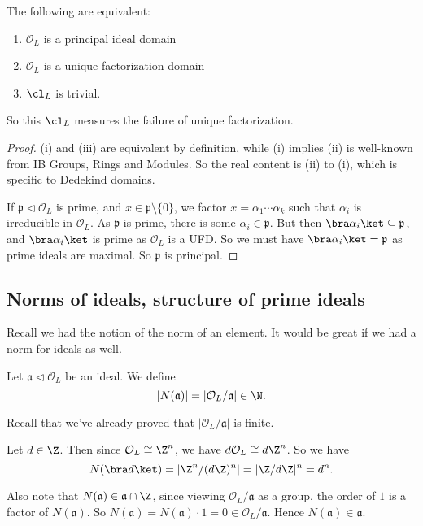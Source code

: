 \documentclass[a4paper]{article}
\begin{document}
\begin{thm}
  The following are equivalent:
  \begin{enumerate}
    \item $\mathcal{O}_L$ is a principal ideal domain
    \item $\mathcal{O}_L$ is a unique factorization domain
    \item $\cl_L$ is trivial.
  \end{enumerate}
\end{thm}
So this $\cl_L$ measures the failure of unique factorization.
\begin{proof}
  (i) and (iii) are equivalent by definition, while (i) implies (ii) is well-known from IB Groups, Rings and Modules. So the real content is (ii) to (i), which is specific to Dedekind domains.

  If $\mathfrak{p} \lhd \mathcal{O}_L$ is prime, and $x \in \mathfrak{p} \setminus \{0\}$, we factor $x = \alpha_1 \cdots \alpha_k$ such that $\alpha_i$ is irreducible in $\mathcal{O}_L$. As $\mathfrak{p}$ is prime, there is some $\alpha_i \in \mathfrak{p}$. But then $\bra \alpha_i\ket \subseteq \mathfrak{p}$, and $\bra \alpha_i\ket$ is prime as $\mathcal{O}_L$ is a UFD. So we must have $\bra \alpha_i\ket = \mathfrak{p}$ as prime ideals are maximal. So $\mathfrak{p}$ is principal.
\end{proof}

\subsection{Norms of ideals, structure of prime ideals}
Recall we had the notion of the norm of an element. It would be great if we had a norm for ideals as well.
\begin{defi}
  Let $\mathfrak{a} \lhd \mathcal{O}_L$ be an ideal. We define
  \[
    |N(\mathfrak{a})| = |\mathcal{O}_L/\mathfrak{a}| \in \N.
  \]
\end{defi}
Recall that we've already proved that $|\mathcal{O}_L/\mathfrak{a}|$ is finite.

\begin{eg}
  Let $d \in \Z$. Then since $\mathcal{O}_L \cong \Z^n$, we have $d \mathcal{O}_L \cong d \Z^n$. So we have
  \[
    N(\bra d\ket) = |\Z^n/(d\Z)^n| = |\Z/d\Z|^n = d^n.
  \]
\end{eg}
Also note that $N(\mathfrak{a}) \in \mathfrak{a} \cap \Z$, since viewing $\mathcal{O}_L/\mathfrak{a}$ as a group, the order of $1$ is a factor of $N(\mathfrak{a})$. So $N(\mathfrak{a}) = N(\mathfrak{a}) \cdot 1 = 0 \in \mathcal{O}_L/\mathfrak{a}$. Hence $N(\mathfrak{a}) \in \mathfrak{a}$.
\end{document}

